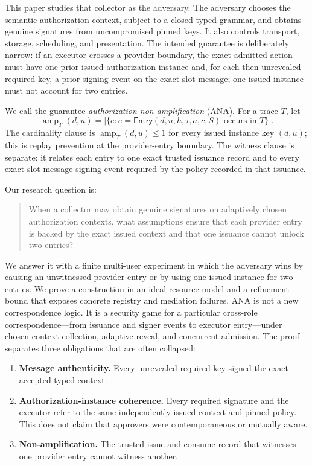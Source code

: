\documentclass[10pt]{article}
\newcommand{\Entry}{\mathsf{Entry}}
\begin{document}
This paper studies that collector as the adversary. The adversary chooses the
semantic authorization context, subject to a closed typed grammar, and obtains
genuine signatures from uncompromised pinned keys. It also controls transport,
storage, scheduling, and presentation. The intended guarantee is deliberately
narrow: if an executor crosses a provider boundary, the exact admitted action
must have one prior issued authorization instance and, for each then-unrevealed
required key, a prior signing event on the exact slot message; one issued
instance must not account for two entries.

We call the guarantee \emph{authorization non-amplification} (ANA). For a trace
$T$, let
\[
  \operatorname{amp}_T(d,u)=
  |\{e:e=\Entry(d,u,h,\tau,a,c,S)\text{ occurs in }T\}|.
\]
The cardinality clause is $\operatorname{amp}_T(d,u)\leq 1$ for every issued
instance key $(d,u)$; this is replay prevention at the provider-entry boundary.
The witness clause is separate: it relates each entry to one exact trusted
issuance record and to every exact slot-message signing event required by the
policy recorded in that issuance.

Our research question is:

\begin{quote}
When a collector may obtain genuine signatures on adaptively chosen
authorization contexts, what assumptions ensure that each provider entry is
backed by the exact issued context and that one issuance cannot unlock two
entries?
\end{quote}

We answer it with a finite multi-user experiment in which the adversary wins by
causing an unwitnessed provider entry or by using one issued instance for two
entries. We prove a construction in an ideal-resource model and a refinement bound
that exposes concrete registry and mediation failures. ANA is not a new
correspondence logic. It is a security game for a particular cross-role
correspondence---from issuance and signer events to executor entry---under
chosen-context collection, adaptive reveal, and concurrent admission. The
proof separates three obligations that are often collapsed:

\begin{enumerate}[leftmargin=*]
\item \textbf{Message authenticity.} Every unrevealed required key signed the
exact accepted typed context.
\item \textbf{Authorization-instance coherence.} Every required signature and
the executor refer to the same independently issued context and pinned policy.
This does not claim that approvers were contemporaneous or mutually aware.
\item \textbf{Non-amplification.} The trusted issue-and-consume record that
witnesses one provider entry cannot witness another.
\end{enumerate}
\end{document}
